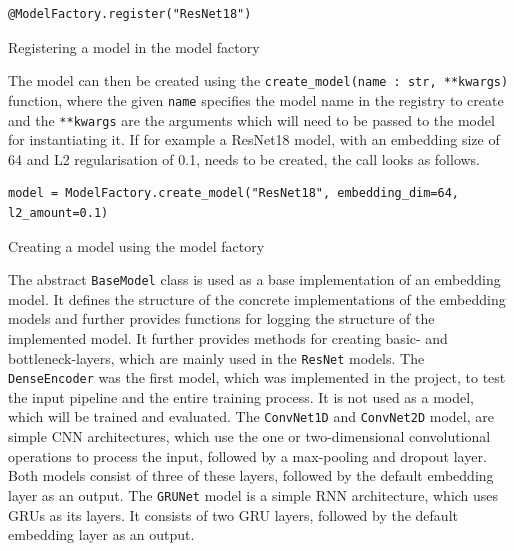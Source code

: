 \begin{code}[htbp]
\begin{verbatim}
@ModelFactory.register("ResNet18")
\end{verbatim}
\caption{Registering a model in the model factory}
\label{code:Model-Factory}
\end{code}
\noindent
The model can then be created using the \texttt{create\_model(name : str, **kwargs)} function, where the given \texttt{name} specifies the model name in the registry to create and the \texttt{**kwargs} are the arguments which will need to be passed to the model for instantiating it. If for example a ResNet18 model, with an embedding size of 64 and L2 regularisation of 0.1, needs to be created, the call looks as follows.

\begin{code}[htbp]
\begin{verbatim}
model = ModelFactory.create_model("ResNet18", embedding_dim=64, l2_amount=0.1)
\end{verbatim}
\caption{Creating a model using the model factory}
\label{code:Model-Factory-Creating}
\end{code}
\noindent
The abstract \texttt{BaseModel} class is used as a base implementation of an embedding model. It defines the structure of the concrete implementations of the embedding models and further provides functions for logging the structure of the implemented model. It further provides methods for creating basic- and bottleneck-layers, which are mainly used in the \texttt{ResNet} models.
\newline
\newline
The \texttt{DenseEncoder} was the first model, which was implemented in the project, to test the input pipeline and the entire training process. It is not used as a model, which will be trained and evaluated.
\newline
\newline
The \texttt{ConvNet1D} and \texttt{ConvNet2D} model, are simple \gls{CNN} architectures, which use the one or two-dimensional convolutional operations to process the input, followed by a max-pooling and dropout layer. Both models consist of three of these layers, followed by the default embedding layer as an output.
\newline
\newline
The \texttt{GRUNet} model is a simple \gls{RNN} architecture, which uses \glspl{GRU} as its layers. It consists of two \gls{GRU} layers, followed by the default embedding layer as an output.
